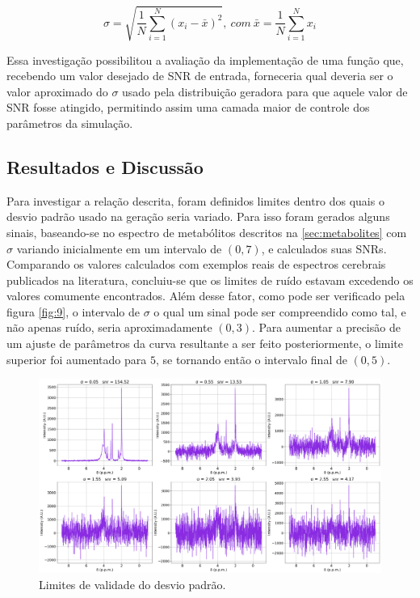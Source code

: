 \documentclass[
12pt,		
twoside, 
a4paper,
chapter=TITLE,
english,			
brazil]{USPSC-classe/USPSC}
\begin{document}
\begin{equation} \label{eq:5}
    \sigma = \sqrt{\frac{1}{N} \sum_{i=1}^{N} (x_i - \bar{x})^2}, \ com \ \bar{x} = \frac{1}{N} \sum_{i = 1}^{N} x_i  
\end{equation}

Essa investigação possibilitou a avaliação da implementação de uma função que, recebendo um valor desejado de SNR de entrada, forneceria qual deveria ser o valor aproximado do $\sigma$ usado pela distribuição 
geradora para que aquele valor de SNR fosse atingido, permitindo assim uma camada maior de controle dos parâmetros da simulação.

\subsection{Resultados e Discussão}

Para investigar a relação descrita, foram definidos limites dentro dos quais o desvio padrão usado na geração seria variado. Para isso foram gerados alguns sinais, baseando-se no espectro de metabólitos descritos na \autoref{sec:metabolites} com $\sigma$ variando inicialmente em um intervalo de $(0, 7)$, e calculados suas SNRs.
Comparando os valores calculados com exemplos reais de espectros cerebrais publicados na literatura, concluiu-se que os limites de ruído estavam excedendo os valores comumente encontrados. Além desse fator, como pode ser verificado pela figura \autoref{fig:9}, o intervalo de $\sigma$ o qual um sinal pode ser compreendido como tal, e não apenas ruído, seria aproximadamente $(0, 3)$. Para aumentar a precisão de um ajuste de parâmetros da 
curva resultante a ser feito posteriormente, o limite superior foi aumentado para $5$, se tornando então o intervalo final de $(0, 5)$.

\begin{figure}[H]
    \includegraphics[scale=0.22]{snr_limits.png}
    \centering
    \caption{Limites de validade do desvio padrão.}
    \label{fig:9}
\end{figure}
\end{document}
